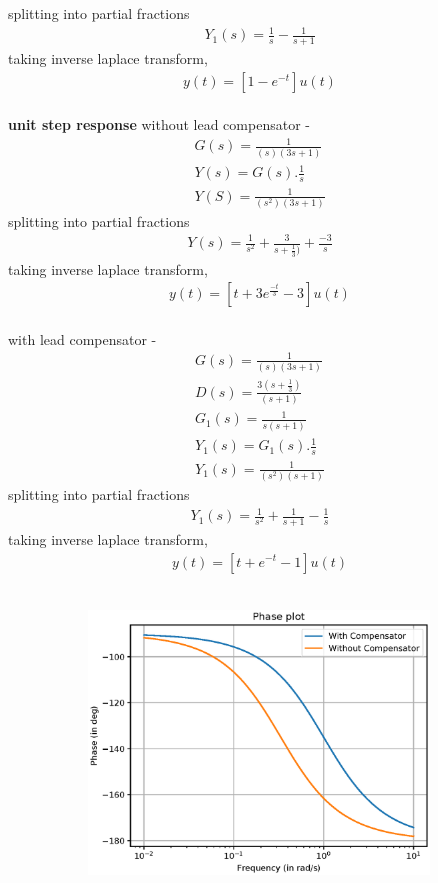 \begin{enumerate}[label=\thesection.\arabic*.,ref=\thesection.\theenumi]
splitting into partial fractions\\
\begin{align}
Y_{1}(s) = \frac{1}{s} - \frac{1}{s+1}
\end{align}
taking inverse laplace transform, \\
\begin{align}
y(t) = [ 1 - e^{-t}]u(t)
\end{align}
\\
\textbf{unit step response}
without lead compensator - \\
\begin{align}
G(s) = \frac{1}{(s)(3s+1)}\\
Y(s) = G(s).\frac{1}{s}\\
Y(S) = \frac{1}{(s^2)(3s+1)}
\end{align}
splitting into partial fractions\\
\begin{align}
Y(s) = \frac{1}{s^2} + \frac{3}{s+\frac{1}{3})} + \frac{-3}{s}
\end{align}
taking inverse laplace transform, \\
\begin{align}
y(t) = [t + 3e^{\frac{-t}{3}} - 3]u(t)
\end{align}
\\
with lead compensator - \\
\begin{align}
G(s) = \frac{1}{(s)(3s+1)}\\
D(s) = \frac{3(s+\frac{1}{3})}{(s+1)} \\
G_{1}(s) = \frac{1}{s(s+1)}\\
Y_{1}(s) = G_{1}(s).\frac{1}{s}\\
Y_{1}(s) = \frac{1}{(s^2)(s+1)}
\end{align}
splitting into partial fractions\\
\begin{align}
Y_{1}(s) = \frac{1}{s^2} + \frac{1}{s+1} - \frac{1}{s}
\end{align}
taking inverse laplace transform, \\
\begin{align}
y(t) = [t + e^{-t} - 1]u(t)
\end{align}
\\
\begin{figure}
\begin{subfigure}{\textwidth}
\includegraphics[width=1\linewidth, height=7cm ,inner]{./figs/ee18btech11027/lead_compensator_phase.eps} 

\end{subfigure}
\end{figure}
\end{enumerate}
